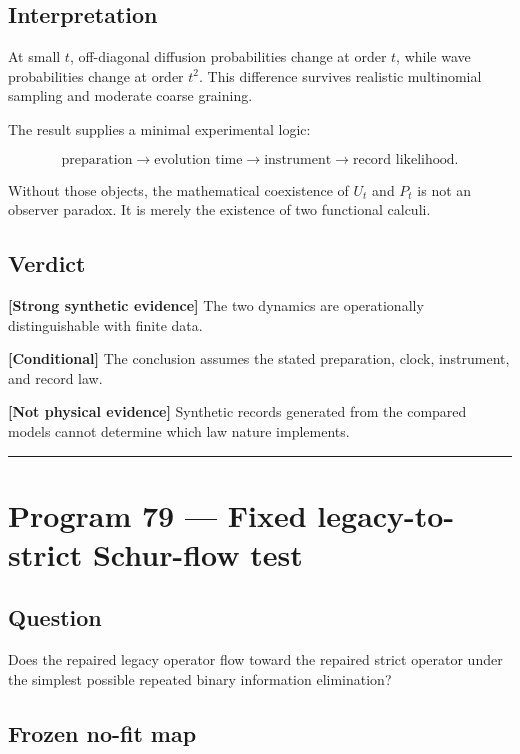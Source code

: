 \documentclass[11pt,a4paper,openany]{report}
\newcommand{\statusConditional}{\textcolor{finorange}{[Conditional]}}
\begin{document}
\section{Interpretation}

At small \(t\), off-diagonal diffusion probabilities change at order \(t\), while wave probabilities change at order \(t^2\). This difference survives realistic multinomial sampling and moderate coarse graining.

The result supplies a minimal experimental logic:

\[
\text{preparation}
\longrightarrow
\text{evolution time}
\longrightarrow
\text{instrument}
\longrightarrow
\text{record likelihood}.
\]

Without those objects, the mathematical coexistence of \(U_t\) and \(P_t\) is not an observer paradox. It is merely the existence of two functional calculi.

\section{Verdict}

\textbf{[Strong synthetic evidence]} The two dynamics are operationally distinguishable with finite data.

\textbf{\statusConditional{}} The conclusion assumes the stated preparation, clock, instrument, and record law.

\textbf{[Not physical evidence]} Synthetic records generated from the compared models cannot determine which law nature implements.

\par\medskip\hrule\medskip

\chapter{Program 79 --- Fixed legacy-to-strict Schur-flow test}

\section{Question}

Does the repaired legacy operator flow toward the repaired strict operator under the simplest possible repeated binary information elimination?

\section{Frozen no-fit map}
\end{document}
